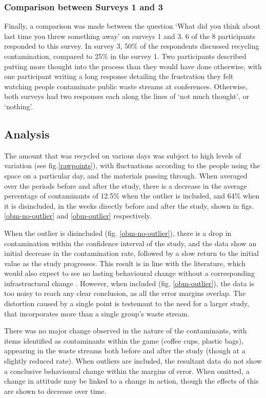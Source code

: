 \documentclass[nofonts,nols,justified,nobib]{tufte-book}
\begin{document}
\subsubsection*{Comparison between Surveys 1 and 3}
Finally, a comparison was made between the question `What did you think about last time you threw something away' on surveys 1 and 3. 6 of the 8 participants responded to this survey. In survey 3, 50\% of the respondents discussed recycling contamination, compared to 25\% in the survey 1. Two participants described putting more thought into the process than they would have done otherwise, with one participant writing a long response detailing the frustration they felt watching people contaminate public waste streams at conferences. Otherwise, both surveys had two responses each along the lines of `not much thought', or `nothing'.

\subsection*{Analysis}
The amount that was recycled on various days was subject to high levels of variation (see fig.\ref{rawpoints}), with fluctuations according to the people using the space on a particular day, and the materials passing through. When averaged over the periods before and after the study, there is a decrease in the average percentage of contaminants of 12.5\% when the outlier is included, and 64\% when it is disincluded, in the weeks directly before and after the study, shown in figs. \ref{obm-no-outlier} and \ref{obm-outlier} respectively.

When the outlier is disincluded (fig. \ref{obm-no-outlier}), there is a drop in contamination within the confidence interval of the study, and the data show an initial decrease in the contamination rate, followed by a slow return to the initial value as the study progresses. This result is in line with the literature, which would also expect to see no lasting behavioural change without a corresponding infrastructural change \cite{}. However, when included (fig. \ref{obm-outlier}), the data is too noisy to reach any clear conclusion, as all the error margins overlap. The distortion caused by a single point is testemant to the need for a larger study, that incorporates more than a single group's waste stream.

There was no major change observed in the nature of the contaminants, with items identified as contaminants within the game (coffee cups, plastic bags), appearing in the waste streams both before and after the study (though at a slightly reduced rate). When outliers are included, the resultant data do not show a conclusive behavioural change within the margins of error. When omitted, a change in attitude may be linked to a change in action, though the effects of this are shown to decrease over time.
\end{document}
